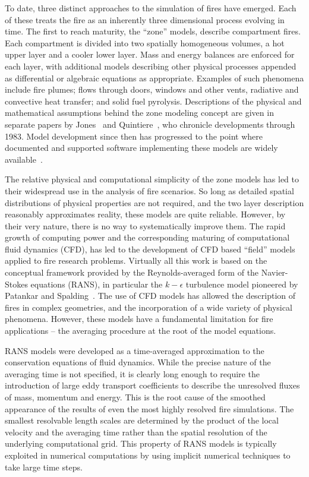 To date, three distinct approaches to the simulation of fires have emerged.
Each of these treats the fire as an inherently three dimensional process evolving in time.
The first to reach maturity, the ``zone'' models, describe compartment fires.
Each compartment is divided into two spatially homogeneous volumes, a hot upper layer and a cooler lower layer.
Mass and energy balances are enforced for each layer, with additional models describing other
physical processes appended as differential or algebraic equations as appropriate.
Examples of such phenomena include fire plumes; flows through doors, windows and other vents,
radiative and convective heat transfer; and solid fuel pyrolysis.
Descriptions of the physical and mathematical assumptions
behind the zone modeling concept are given in separate papers by Jones~\cite{Jones:1} and Quintiere~\cite{Quintiere:1},
who chronicle developments through 1983.
Model development since then has progressed to the point where
documented and supported software implementing these models are widely available~\cite{Forney:1}.

The relative physical and computational simplicity of the zone models has led to their
widespread use in the analysis of fire scenarios. So long as detailed spatial
distributions of physical properties are not required, and the two layer description
reasonably approximates reality, these models are quite reliable.
However, by their very nature, there is no way to systematically improve them.
The rapid growth of computing power and the corresponding maturing of computational
fluid dynamics (CFD), has led to the development of CFD based ``field'' models applied to fire research problems.
Virtually all this work is based on the conceptual framework provided by the Reynolds-averaged form of the
Navier-Stokes equations (RANS), in particular the $k -\epsilon$ turbulence model pioneered by
Patankar and Spalding~\cite{Patankar:1}. The use of CFD models has allowed
the description of fires in complex geometries, and the incorporation of a wide variety of
physical phenomena. However, these models have a fundamental limitation for fire applications --
the averaging procedure at the root of the model equations.

RANS models were developed as a time-averaged approximation to the conservation equations of fluid dynamics.
While the precise nature of the averaging time is not specified, it is clearly long enough to
require the introduction of large eddy transport coefficients to describe the unresolved fluxes of mass,
momentum and energy. This is the root cause of the smoothed appearance of the results of even the most
highly resolved fire simulations. The smallest resolvable length scales are determined by the product
of the local velocity and the averaging time rather than the spatial resolution of the underlying computational grid.
This property of RANS models is typically exploited in numerical computations by using implicit
numerical techniques to take large time steps.

